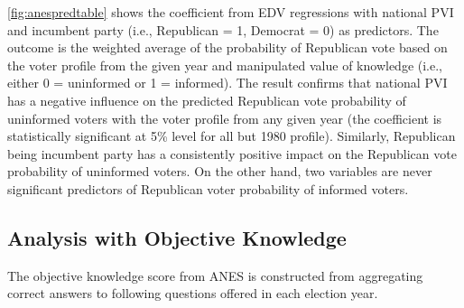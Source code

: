 \par \autoref{fig:anespredtable} shows the coefficient from EDV regressions with national PVI and incumbent party (i.e., Republican = 1, Democrat = 0) as predictors. The outcome is the weighted average of the probability of Republican vote based on the voter profile from the given year and manipulated value of knowledge (i.e., either 0 = uninformed or 1 = informed). The result confirms that national PVI has a negative influence on the predicted Republican vote probability of uninformed voters with the voter profile from any given year (the coefficient is statistically significant at 5\% level for all but 1980 profile). Similarly, Republican being incumbent party has a consistently positive impact on the Republican vote probability of uninformed voters. On the other hand, two variables are never significant predictors of Republican voter probability of informed voters.        

\clearpage
\subsection{Analysis with Objective Knowledge}

\par The objective knowledge score from ANES is constructed from aggregating correct answers to following questions offered in each election year. 

